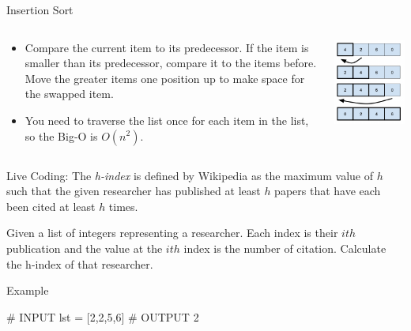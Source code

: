 \documentclass[
  ignorenonframetext,
]{beamer}
\newenvironment{Shaded}{\begin{snugshade}}{\end{snugshade}}
\newcommand{\CommentTok}[1]{\textcolor[rgb]{0.37,0.37,0.37}{#1}}
\newcommand{\DecValTok}[1]{\textcolor[rgb]{0.68,0.00,0.00}{#1}}
\newcommand{\NormalTok}[1]{\textcolor[rgb]{0.00,0.23,0.31}{#1}}
\newcommand{\OperatorTok}[1]{\textcolor[rgb]{0.37,0.37,0.37}{#1}}
\begin{document}
\begin{frame}{Insertion Sort}
\protect\hypertarget{insertion-sort}{}
\begin{columns}[T]
\begin{column}{0.6\textwidth}
\begin{itemize}
\item
  Compare the current item to its predecessor. If the item is smaller
  than its predecessor, compare it to the items before. Move the greater
  items one position up to make space for the swapped item.
\item
  You need to traverse the list once for each item in the list, so the
  Big-O is \(O(n^2)\).
\end{itemize}
\end{column}

\begin{column}{0.4\textwidth}
\includegraphics{images/insertion-sort.png}
\end{column}
\end{columns}
\end{frame}

\begin{frame}[fragile]{Live Coding:}
\protect\hypertarget{live-coding}{}
The \emph{h-index} is defined by Wikipedia as the maximum value of \(h\)
such that the given researcher has published at least \(h\) papers that
have each been cited at least \(h\) times.

Given a list of integers representing a researcher. Each index is their
\(ith\) publication and the value at the \(ith\) index is the number of
citation. Calculate the h-index of that researcher.

\begin{block}{Example}
\protect\hypertarget{example}{}
\begin{Shaded}
\begin{Highlighting}[]
\CommentTok{\# INPUT}
\NormalTok{lst }\OperatorTok{=}\NormalTok{ [}\DecValTok{2}\NormalTok{,}\DecValTok{2}\NormalTok{,}\DecValTok{5}\NormalTok{,}\DecValTok{6}\NormalTok{]}
\CommentTok{\# OUTPUT}
\DecValTok{2}
\end{Highlighting}
\end{Shaded}
\end{block}
\end{frame}
\end{document}
